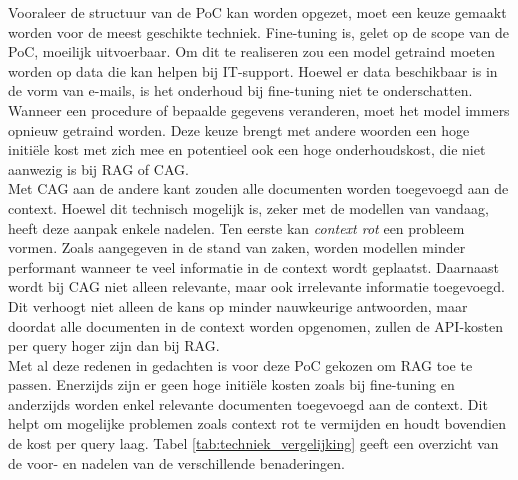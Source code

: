 Vooraleer de structuur van de PoC kan worden opgezet, moet een keuze gemaakt worden voor de meest geschikte techniek. Fine-tuning is, gelet op de scope van de PoC, moeilijk uitvoerbaar. Om dit te realiseren zou een model getraind moeten worden op data die kan helpen bij IT-support. Hoewel er data beschikbaar is in de vorm van e-mails, is het onderhoud bij fine-tuning niet te onderschatten. Wanneer een procedure of bepaalde gegevens veranderen, moet het model immers opnieuw getraind worden. Deze keuze brengt met andere woorden een hoge initiële kost met zich mee en potentieel ook een hoge onderhoudskost, die niet aanwezig is bij RAG of CAG.
\\[1em]
Met CAG aan de andere kant zouden alle documenten worden toegevoegd aan de context. Hoewel dit technisch mogelijk is, zeker met de modellen van vandaag, heeft deze aanpak enkele nadelen. Ten eerste kan \textit{context rot} een probleem vormen. Zoals aangegeven in de stand van zaken, worden modellen minder performant wanneer te veel informatie in de context wordt geplaatst. Daarnaast wordt bij CAG niet alleen relevante, maar ook irrelevante informatie toegevoegd. Dit verhoogt niet alleen de kans op minder nauwkeurige antwoorden, maar doordat alle documenten in de context worden opgenomen, zullen de API-kosten per query hoger zijn dan bij RAG.
\\[1em]
Met al deze redenen in gedachten is voor deze PoC gekozen om RAG toe te passen. Enerzijds zijn er geen hoge initiële kosten zoals bij fine-tuning en anderzijds worden enkel relevante documenten toegevoegd aan de context. Dit helpt om mogelijke problemen zoals context rot te vermijden en houdt bovendien de kost per query laag. Tabel \ref{tab:techniek_vergelijking} geeft een overzicht van de voor- en nadelen van de verschillende benaderingen.

\begin{table}[H]
    \caption{Vergelijking van voor- en nadelen van fine-tuning, CAG en RAG}
    \label{tab:techniek_vergelijking}
\end{table}

